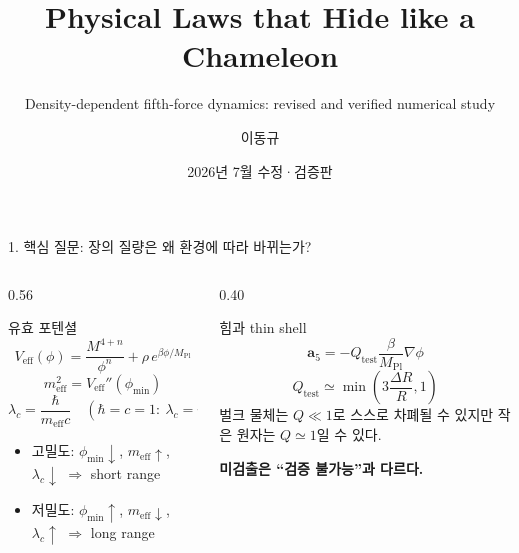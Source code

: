 \documentclass[10pt,aspectratio=169]{beamer}
\title[Chameleon Screening Dynamics]{Physical Laws that Hide like a Chameleon}
\subtitle{Density-dependent fifth-force dynamics: revised and verified numerical study}
\author[Dongkyu Lee]{이동규}
\institute[서울대학교]{서울대학교 물리천문학부 물리학전공}
\date{2026년 7월 수정·검증판}
\begin{document}
\begin{frame}[plain]
 \titlepage
\end{frame}

\begin{frame}{1. 핵심 질문: 장의 질량은 왜 환경에 따라 바뀌는가?}
 \begin{columns}[T]
  \begin{column}{0.56\textwidth}
   \begin{block}{유효 포텐셜}
    \[
     V_{\mathrm{eff}}(\phi)=\frac{M^{4+n}}{\phi^n}
     +\rho\,e^{\beta\phi/M_{\mathrm{Pl}}}
    \]
    \[
     m_{\mathrm{eff}}^2=V_{\mathrm{eff}}''(\phi_{\min})
    \]
    \[
     \lambda_c=\frac{\hbar}{m_{\mathrm{eff}}c}
     \quad(\hbar=c=1:\ \lambda_c=m_{\mathrm{eff}}^{-1})
    \]
   \end{block}
   \begin{itemize}
    \item 고밀도: $\phi_{\min}\downarrow$, $m_{\mathrm{eff}}\uparrow$, $\lambda_c\downarrow$ \(\Rightarrow\) short range
    \item 저밀도: $\phi_{\min}\uparrow$, $m_{\mathrm{eff}}\downarrow$, $\lambda_c\uparrow$ \(\Rightarrow\) long range
   \end{itemize}
  \end{column}
  \begin{column}{0.40\textwidth}
   \begin{block}{힘과 thin shell}
    \small
    \[
     \mathbf a_5=-Q_{\mathrm{test}}\frac{\beta}{M_{\mathrm{Pl}}}\nabla\phi
    \]
    \[
     Q_{\mathrm{test}}\simeq\min\!\left(3\frac{\Delta R}{R},1\right)
    \]
    벌크 물체는 $Q\ll1$로 스스로 차폐될 수 있지만 작은 원자는 $Q\simeq1$일 수 있다.
   \end{block}
   \vspace{0.3cm}
   \centering\textcolor{TealAccent}{\bfseries 미검출은 ``검증 불가능''과 다르다.}
  \end{column}
 \end{columns}
\end{frame}
\end{document}
